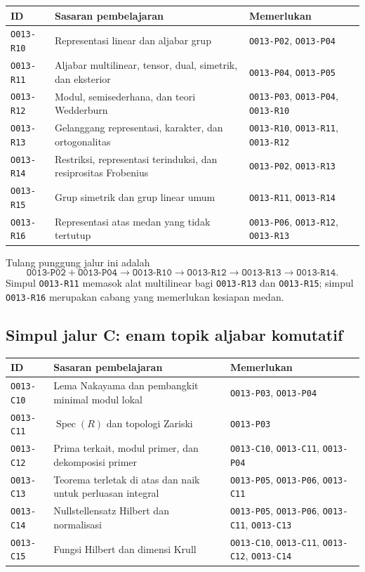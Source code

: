 \documentclass[11pt,a4paper]{article}
\newcommand{\oid}[1]{\texttt{#1}}
\begin{document}
\begin{longtable}{>{\raggedright\arraybackslash}p{2.3cm}p{5.2cm}p{6.8cm}}
\toprule
ID & Sasaran pembelajaran & Memerlukan \\
\midrule
\endhead
\oid{O013-R10} & Representasi linear dan aljabar grup &
\oid{O013-P02}, \oid{O013-P04} \\
\oid{O013-R11} & Aljabar multilinear, tensor, dual, simetrik, dan eksterior &
\oid{O013-P04}, \oid{O013-P05} \\
\oid{O013-R12} & Modul, semisederhana, dan teori Wedderburn &
\oid{O013-P03}, \oid{O013-P04}, \oid{O013-R10} \\
\oid{O013-R13} & Gelanggang representasi, karakter, dan ortogonalitas &
\oid{O013-R10}, \oid{O013-R11}, \oid{O013-R12} \\
\oid{O013-R14} & Restriksi, representasi terinduksi, dan resiprositas Frobenius &
\oid{O013-P02}, \oid{O013-R13} \\
\oid{O013-R15} & Grup simetrik dan grup linear umum &
\oid{O013-R11}, \oid{O013-R14} \\
\oid{O013-R16} & Representasi atas medan yang tidak tertutup &
\oid{O013-P06}, \oid{O013-R12}, \oid{O013-R13} \\
\bottomrule
\end{longtable}

Tulang punggung jalur ini adalah
\[
\oid{O013-P02}+\oid{O013-P04}
\longrightarrow \oid{O013-R10}
\longrightarrow \oid{O013-R12}
\longrightarrow \oid{O013-R13}
\longrightarrow \oid{O013-R14}.
\]
Simpul \oid{O013-R11} memasok alat multilinear bagi
\oid{O013-R13} dan \oid{O013-R15}; simpul \oid{O013-R16} merupakan cabang
yang memerlukan kesiapan medan.

\subsection*{Simpul jalur C: enam topik aljabar komutatif}

\begin{longtable}{>{\raggedright\arraybackslash}p{2.3cm}p{5.2cm}p{6.8cm}}
\toprule
ID & Sasaran pembelajaran & Memerlukan \\
\midrule
\endhead
\oid{O013-C10} & Lema Nakayama dan pembangkit minimal modul lokal &
\oid{O013-P03}, \oid{O013-P04} \\
\oid{O013-C11} & $\operatorname{Spec}(R)$ dan topologi Zariski &
\oid{O013-P03} \\
\oid{O013-C12} & Prima terkait, modul primer, dan dekomposisi primer &
\oid{O013-C10}, \oid{O013-C11}, \oid{O013-P04} \\
\oid{O013-C13} & Teorema terletak di atas dan naik untuk perluasan integral &
\oid{O013-P05}, \oid{O013-P06}, \oid{O013-C11} \\
\oid{O013-C14} & Nullstellensatz Hilbert dan normalisasi &
\oid{O013-P05}, \oid{O013-P06}, \oid{O013-C11}, \oid{O013-C13} \\
\oid{O013-C15} & Fungsi Hilbert dan dimensi Krull &
\oid{O013-C10}, \oid{O013-C11}, \oid{O013-C12}, \oid{O013-C14} \\
\bottomrule
\end{longtable}
\end{document}
